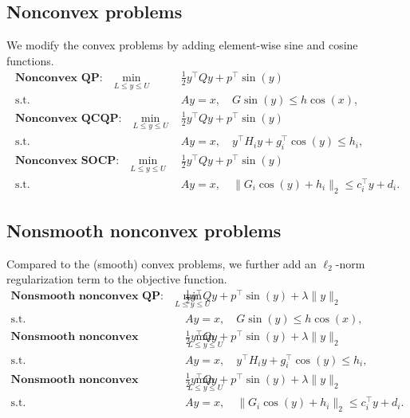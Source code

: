 \documentclass{article}
\def\st{\text{s.t.}}
\def\x{x}
\begin{document}
\subsection{Nonconvex problems}
We modify the convex problems by adding element-wise sine and cosine functions. 
\begin{align*}
    \textbf{Nonconvex QP:} \quad \min_{L \leq y \leq U}\,\, & \frac{1}{2} y^\top Q y + p^\top \sin(y) \\
    \st\,\, & Ay = x, \quad G \sin(y) \leq h\cos(\x), \\
    \textbf{Nonconvex QCQP:} \quad \min_{L \leq y \leq U}\,\, & \frac{1}{2} y^\top Q y + p^\top \sin(y) \\
    \st\,\, & Ay = x, \quad y^\top H_i y + g_i^\top \cos(y) \leq h_i,\\
    \textbf{Nonconvex SOCP:} \quad \min_{L \leq y \leq U}\,\, & \frac{1}{2} y^\top Q y + p^\top \sin(y) \\
    \st\,\, & Ay = x, \quad \| G_i \cos(y) + h_i \|_2 \leq c_i^\top y + d_i.
\end{align*}

\subsection{Nonsmooth nonconvex problems}
Compared to the (smooth) convex problems, we further add an $\ell_2$-norm regularization term to the objective function.
\begin{align*}
    \textbf{Nonsmooth nonconvex QP:} \quad \min_{L \leq y \leq U}\,\, & \frac{1}{2} y^\top Q y + p^\top \sin(y) + \lambda \|y \|_2 \\
    \st\,\, & Ay = x, \quad G \sin(y) \leq h\cos(\x), \\
    \textbf{Nonsmooth nonconvex QCQP:} \quad \min_{L \leq y \leq U}\,\, & \frac{1}{2} y^\top Q y + p^\top \sin(y) + \lambda \|y \|_2\\
    \st\,\, & Ay = x, \quad y^\top H_i y + g_i^\top \cos(y) \leq h_i, \\
    \textbf{Nonsmooth nonconvex SOCP:} \quad \min_{L \leq y \leq U}\,\, & \frac{1}{2} y^\top Q y + p^\top \sin(y) + \lambda \|y \|_2\\
    \st\,\, & Ay = x, \quad \| G_i \cos(y) + h_i \|_2 \leq c_i^\top y + d_i.
\end{align*}
\end{document}
